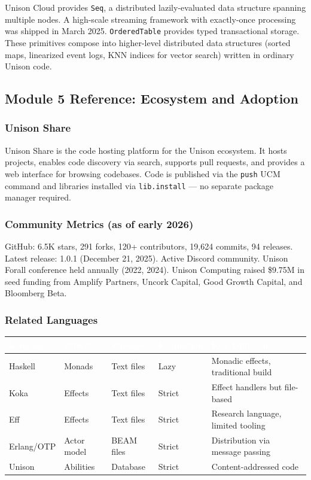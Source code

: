 \documentclass[11pt,letterpaper]{article}
\newcommand{\tableheader}[1]{\textbf{\sffamily\textcolor{white}{#1}}}
\begin{document}
Unison Cloud provides \texttt{Seq}, a distributed lazily-evaluated data structure spanning multiple nodes. A high-scale streaming framework with exactly-once processing was shipped in March 2025. \texttt{OrderedTable} provides typed transactional storage. These primitives compose into higher-level distributed data structures (sorted maps, linearized event logs, KNN indices for vector search) written in ordinary Unison code.

\subsection{Module 5 Reference: Ecosystem and Adoption}

\subsubsection{Unison Share}

Unison Share is the code hosting platform for the Unison ecosystem. It hosts projects, enables code discovery via search, supports pull requests, and provides a web interface for browsing codebases. Code is published via the \texttt{push} UCM command and libraries installed via \texttt{lib.install} --- no separate package manager required.

\subsubsection{Community Metrics (as of early 2026)}

GitHub: 6.5K stars, 291 forks, 120+ contributors, 19,624 commits, 94 releases. Latest release: 1.0.1 (December 21, 2025). Active Discord community. Unison Forall conference held annually (2022, 2024). Unison Computing raised \$9.75M in seed funding from Amplify Partners, Uncork Capital, Good Growth Capital, and Bloomberg Beta.

\subsubsection{Related Languages}

\begin{center}
\begin{tabularx}{\textwidth}{L{2cm}L{2.5cm}L{2.5cm}L{2.5cm}X}
\toprule
{}
\tableheader{Language} & \tableheader{Effects} & \tableheader{Storage} & \tableheader{Evaluation} & \tableheader{Key Difference} \\
\midrule
Haskell & Monads & Text files & Lazy & Monadic effects, traditional build \\
Koka & Effects & Text files & Strict & Effect handlers but file-based \\
Eff & Effects & Text files & Strict & Research language, limited tooling \\
Erlang/OTP & Actor model & BEAM files & Strict & Distribution via message passing \\
Unison & Abilities & Database & Strict & Content-addressed code \\
\bottomrule
\end{tabularx}
\end{center}
\end{document}
